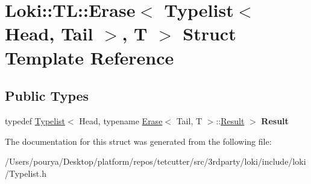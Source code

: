\hypertarget{structLoki_1_1TL_1_1Erase_3_01Typelist_3_01Head_00_01Tail_01_4_00_01T_01_4}{}\section{Loki\+:\+:T\+L\+:\+:Erase$<$ Typelist$<$ Head, Tail $>$, T $>$ Struct Template Reference}
\label{structLoki_1_1TL_1_1Erase_3_01Typelist_3_01Head_00_01Tail_01_4_00_01T_01_4}
\subsection*{Public Types}
\begin{DoxyCompactItemize}
\item 
\hypertarget{structLoki_1_1TL_1_1Erase_3_01Typelist_3_01Head_00_01Tail_01_4_00_01T_01_4_aa5e693a9dd42a85533d02cd5e8581ba1}{}typedef \hyperlink{structLoki_1_1Typelist}{Typelist}$<$ Head, typename \hyperlink{structLoki_1_1TL_1_1Erase}{Erase}$<$ Tail, T $>$\+::\hyperlink{structLoki_1_1Typelist}{Result} $>$ {\bfseries Result}\label{structLoki_1_1TL_1_1Erase_3_01Typelist_3_01Head_00_01Tail_01_4_00_01T_01_4_aa5e693a9dd42a85533d02cd5e8581ba1}

\end{DoxyCompactItemize}


The documentation for this struct was generated from the following file\+:\begin{DoxyCompactItemize}
\item 
/\+Users/pourya/\+Desktop/platform/repos/tetcutter/src/3rdparty/loki/include/loki/Typelist.\+h\end{DoxyCompactItemize}
